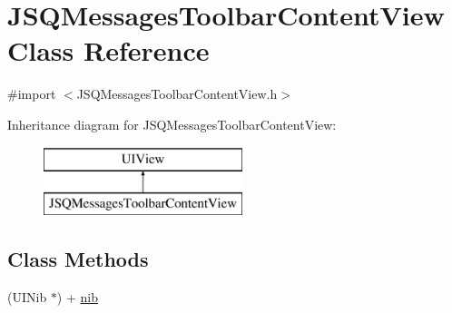 \hypertarget{interface_j_s_q_messages_toolbar_content_view}{}\section{J\+S\+Q\+Messages\+Toolbar\+Content\+View Class Reference}
\label{interface_j_s_q_messages_toolbar_content_view}


{\ttfamily \#import $<$J\+S\+Q\+Messages\+Toolbar\+Content\+View.\+h$>$}

Inheritance diagram for J\+S\+Q\+Messages\+Toolbar\+Content\+View\+:\begin{figure}[H]
\begin{center}
\leavevmode
\includegraphics[height=2.000000cm]{interface_j_s_q_messages_toolbar_content_view}
\end{center}
\end{figure}
\subsection*{Class Methods}
\begin{DoxyCompactItemize}
\item 
(U\+I\+Nib $\ast$) + \hyperlink{interface_j_s_q_messages_toolbar_content_view_a5cffcd9a89b4822dfb45a336fb0b09d6}{nib}
\end{DoxyCompactItemize}

